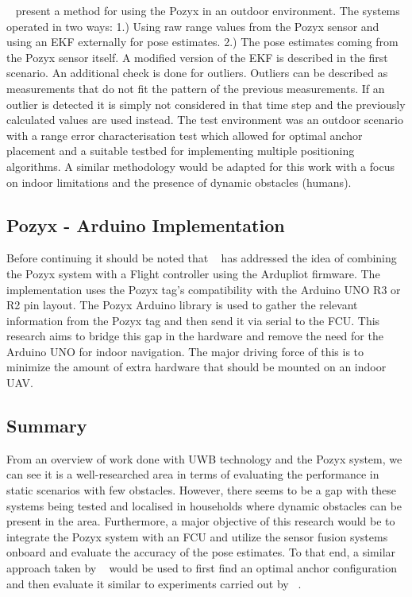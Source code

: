 ~\citet{conceiccao2017robot} present a method for using the Pozyx in an outdoor environment.
The systems operated in two ways: 1.) Using raw range values from the Pozyx sensor and using an EKF externally for pose estimates. 2.) The pose estimates coming from the Pozyx sensor itself.
A modified version of the EKF is described in the first scenario.
An additional check is done for outliers.
Outliers can be described as measurements that do not fit the pattern of the previous measurements.
If an outlier is detected it is simply not considered in that time step and the previously calculated values are used instead.
The test environment was an outdoor scenario with a range error characterisation test which allowed for optimal anchor placement and a suitable testbed for implementing multiple positioning algorithms.
A similar methodology would be adapted for this work with a focus on indoor limitations and the presence of dynamic obstacles (humans).



\subsection{Pozyx - Arduino Implementation}
Before continuing it should be noted that ~\citet{ardupilotarduino} has addressed the idea of combining the Pozyx system with a Flight controller using the Ardupliot firmware.
The implementation uses the Pozyx tag's compatibility with the Arduino UNO R3 or R2 pin layout.
The Pozyx Arduino library is used to gather the relevant information from the Pozyx tag and then send it via serial to the FCU.
This research aims to bridge this gap in the hardware and remove the need for the Arduino UNO for indoor navigation.
The major driving force of this is to minimize the amount of extra hardware that should be mounted on an indoor UAV.

\subsection{Summary}
From an overview of work done with UWB technology and the Pozyx system, we can see it is a well-researched area in terms of evaluating the performance in static scenarios with few obstacles.
However, there seems to be a gap with these systems being tested and localised in households where dynamic obstacles can be present in the area.
Furthermore, a major objective of this research would be to integrate the Pozyx system with an FCU and utilize the sensor fusion systems onboard and evaluate the accuracy of the pose estimates.
To that end, a similar approach taken by ~\citet{di2019evaluation} would be used to first find an optimal anchor configuration and then evaluate it similar to experiments carried out by ~\citet{conceiccao2017robot}.